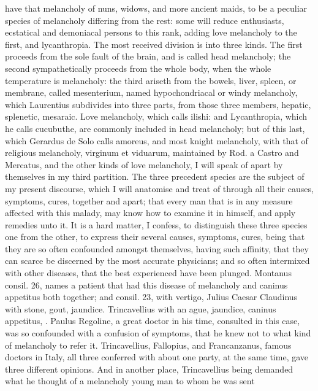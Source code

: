 {{have that melancholy of nuns, widows, and more ancient maids, to be a
peculiar species of melancholy differing from the rest: some will
reduce enthusiasts, ecstatical and demoniacal persons to this rank,
adding  love melancholy to the first, and lycanthropia. The most
received division is into three kinds. The first proceeds from the sole
fault of the brain, and is called head melancholy; the second
sympathetically proceeds from the whole body, when the whole
temperature is melancholy: the third ariseth from the bowels, liver,
spleen, or membrane, called mesenterium, named hypochondriacal or windy
melancholy, which Laurentius subdivides into three parts, from
those three members, hepatic, splenetic, mesaraic. Love melancholy,
which \Avicenna{} calls ilishi: and Lycanthropia, which he calls
cucubuthe, are commonly included in head melancholy; but of this last,
which Gerardus de Solo calls amoreus, and most knight melancholy, with
that of religious melancholy, virginum et viduarum, maintained by Rod.
a Castro and Mercatus, and the other kinds of love melancholy, I will
speak of apart by themselves in my third partition. The three precedent
species are the subject of my present discourse, which I will anatomise
and treat of through all their causes, symptoms, cures, together and
apart; that every man that is in any measure affected with this malady,
may know how to examine it in himself, and apply remedies unto it.
It is a hard matter, I confess, to distinguish these three species one
from the other, to express their several causes, symptoms, cures, being
that they are so often confounded amongst themselves, having such
affinity, that they can scarce be discerned by the most accurate
physicians; and so often intermixed with other diseases, that the best
experienced have been plunged. Montanus consil. 26, names a patient
that had this disease of melancholy and caninus appetitus both
together; and consil. 23, with vertigo, Julius Caesar Claudinus
with stone, gout, jaundice. Trincavellius with an ague, jaundice,
caninus appetitus, \etc{}. Paulus Regoline, a great doctor in his
time, consulted in this case, was so confounded with a confusion of
symptoms, that he knew not to what kind of melancholy to refer it.
Trincavellius, Fallopius, and Francanzanus, famous doctors in
Italy, all three conferred with about one party, at the same time, gave
three different opinions. And in another place, Trincavellius being
demanded what he thought of a melancholy young man to whom he was sent
}}
